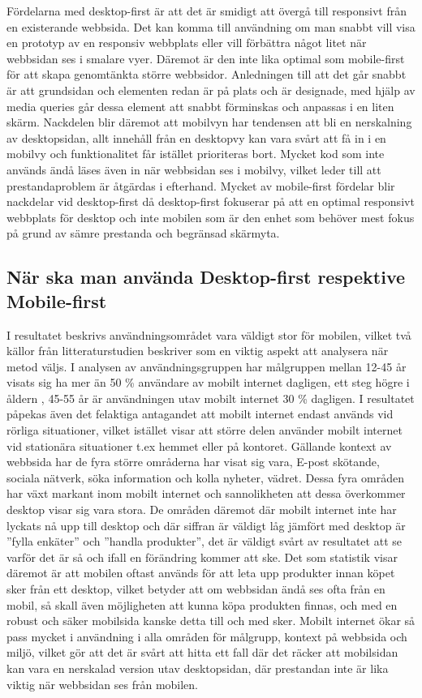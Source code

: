\documentclass[11pt]{article}
\begin{document}
Fördelarna med desktop-first är att det är smidigt att övergå till responsivt från en existerande webbsida. Det kan komma till användning om man snabbt vill visa en prototyp av en responsiv webbplats eller vill förbättra något litet när webbsidan ses i smalare vyer. Däremot är den inte lika optimal som mobile-first för att skapa genomtänkta större webbsidor. Anledningen till att det går snabbt är att grundsidan och elementen redan är på plats och är designade, med hjälp av media queries går dessa element att snabbt förminskas och anpassas i en liten skärm. Nackdelen blir däremot att mobilvyn har tendensen att bli en nerskalning av desktopsidan, allt innehåll från en desktopvy kan vara svårt att få in i en mobilvy och funktionalitet får istället prioriteras bort. Mycket kod som inte används ändå läses även in när webbsidan ses i mobilvy, vilket leder till att prestandaproblem är åtgärdas i efterhand.
Mycket av mobile-first fördelar blir nackdelar vid desktop-first då desktop-first fokuserar på att en optimal responsivt webbplats för desktop och inte mobilen som är den enhet som behöver mest fokus på grund av sämre prestanda och begränsad skärmyta.

\subsection{När ska man använda Desktop-first respektive Mobile-first}
I resultatet beskrivs användningsområdet vara väldigt stor för mobilen, vilket två källor från litteraturstudien beskriver som en viktig aspekt att analysera när metod väljs. I analysen av användningsgruppen har målgruppen mellan 12-45 år visats sig ha mer än 50 \% användare av mobilt internet dagligen, ett steg högre i åldern , 45-55 år är användningen utav mobilt internet 30 \% dagligen. I resultatet påpekas även det felaktiga antagandet att mobilt internet endast används vid rörliga situationer, vilket istället visar att större delen använder mobilt internet vid stationära situationer t.ex hemmet eller på kontoret. Gällande kontext av webbsida har de fyra större områderna har visat sig vara, E-post skötande, sociala nätverk, söka information och kolla nyheter, vädret.  Dessa fyra områden har växt markant inom mobilt internet och sannolikheten att dessa överkommer desktop visar sig vara stora. De områden däremot där mobilt internet inte har lyckats nå upp till desktop och där siffran är väldigt låg jämfört med desktop är ”fylla enkäter” och ”handla produkter”, det är väldigt svårt av resultatet att se varför det är så och ifall en förändring kommer att ske. Det som statistik visar däremot är att mobilen oftast används för att leta upp produkter innan köpet sker från ett desktop, vilket betyder att om webbsidan ändå ses ofta från en mobil, så skall även möjligheten att kunna köpa produkten finnas, och med en robust och säker mobilsida kanske detta till och med sker. Mobilt internet ökar så pass mycket i användning i alla områden för målgrupp, kontext på webbsida och miljö, vilket gör att det är svårt att hitta ett fall där det räcker att mobilsidan kan vara en nerskalad version utav desktopsidan, där prestandan inte är lika viktig när webbsidan ses från mobilen.
\end{document}
